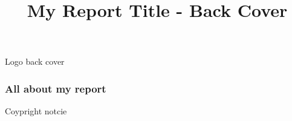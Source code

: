 \documentclass{article}
\begin{document}
\title{My Report Title - Back Cover}

\maketitle


Logo back cover


\subsubsection{All about my report}\label{H3446123}



Coypright notcie
\end{document}
